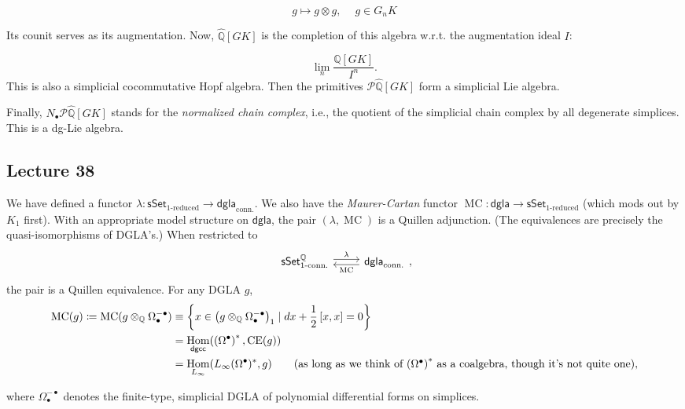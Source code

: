 \documentclass[10pt,letterpaper,cm]{nupset}
\theoremstyle{definition}
\theoremstyle{theorem}
\theoremstyle{remark}
\renewcommand{\P}{\mathcal P}
\newcommand{\Q}{\mathbb Q}
\newcommand{\1}{\mathbb{1}}
\newcommand{\0}{\vec 0}
\DeclareMathOperator{\Hom}{Hom}
\DeclareMathOperator{\mc}{MC}
\DeclareMathOperator{\ce}{CE}
\begin{document}
\[
g \mapsto g \otimes g, \ \quad g \in G_n{K}
\]

Its counit serves as its augmentation. Now, $\hat{\Q}\left[G{K}\right]$ is the completion of this algebra w.r.t. the augmentation ideal $I$:

\[
\lim_n\frac{\Q\left[G{K}\right]}{I^n}
.\] 
This is also a simplicial cocommutative Hopf algebra. Then the primitives $\P{\hat{\Q}\left[G{K}\right]}$ form a simplicial Lie algebra. 

\medskip

Finally,  $N_{\bullet}{\P{\hat{\Q}\left[G{K}\right]}}$ stands for the \textit{normalized chain complex}, i.e., the quotient of the simplicial chain complex by all degenerate simplices. This is a dg-Lie algebra. 

\subsection{Lecture 38}

We have defined a functor $\lambda : \mathsf{sSet}_{\text{$1$-reduced}} \to \mathsf{dgla}_{\text{conn.}}$. We also have the \textit{Maurer-Cartan} functor  \linebreak $\mc : \mathsf{dgla} \to \mathsf{sSet}_{\text{$1$-reduced}}$ (which mods out by $K_1$  first). With an appropriate model structure on $\mathsf{dgla}$, the pair $\left(\lambda, \mc\right)$ is a Quillen adjunction. (The equivalences are precisely the quasi-isomorphisms of DGLA's.) When restricted to 
\[
\begin{tikzcd}
	{\mathsf{sSet}_{\text{$1$-conn.}}^{\Q}} & {\mathsf{dgla}_{\text{conn.}}}
	\arrow["\lambda", shift left=1, from=1-1, to=1-2]
	\arrow["\mc", shift left=1, from=1-2, to=1-1]
\end{tikzcd}
,\]
the pair is a Quillen equivalence. For any DGLA $g$,
\begin{align*}
\mc(g) \coloneqq \mc(g \otimes_{\Q} \Omega_{\bullet}^{-{\bullet}}) & \equiv \left\{x \in \left(g \otimes_{\Q} \Omega_{\bullet}^{-{\bullet}}\right)_1 \mid d{x} + \frac{1}{2}\left[x,x\right] = 0 \right\}
\\ & =  \Hom_{\mathsf{dgcc}}(\left(\Omega^{\bullet}\right)^{\ast}, \ce(g))
\\ & = \Hom_{L_{\infty}}(L_{\infty}{(\Omega^{\bullet})^{\ast}}, g) \tag{as long as we think of $\left(\Omega^{\bullet}\right)^{\ast}$ as a coalgebra, though it's not quite one}
,\end{align*}

where $\Omega_{\bullet}^{-{\bullet}}$ denotes the finite-type, simplicial DGLA of polynomial differential forms on simplices.
\end{document}
